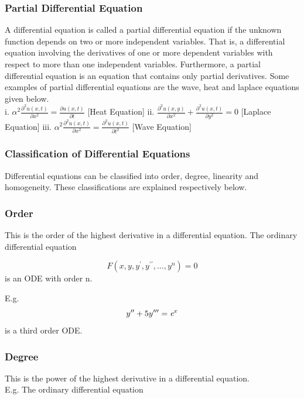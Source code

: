 \documentclass[12pt]{article}
\begin{document}
	\subsubsection*{Partial Differential Equation} 
	A differential equation is called a partial differential equation if the unknown function depends on two or more independent variables. That is, a differential equation involving the derivatives of one or more dependent variables with respect to more than one independent variables. Furthermore, a partial differential equation is an equation that contains only partial derivatives. Some examples of partial differential equations are the wave, heat and laplace equations given below. \\
\smallskip
i. $\alpha^{2}\frac{\partial^{2}u(x,t)}{\partial x^{2}} =  \frac{\partial u(x,t)}{\partial t} $    [Heat Equation]
ii. $\frac{\partial^{2}u(x,y)}{\partial x^{2}} + \frac{\partial^{2}u(x,t)}{\partial y^{2}} = 0 $   [Laplace Equation]  
iii. $\alpha^{2}\frac{\partial^{2}u(x,t)}{\partial x^{2}} = \frac{\partial^{2}u(x,t)}{\partial t^{2}} $   [Wave Equation]

	
	\subsubsection{Classification of Differential Equations} 
	Differential equations can be classified into order, degree, linearity and homogeneity. These classifications are explained respectively below.
	\subsubsection*{Order} 
	This is the order of the highest derivative in a differential equation. The ordinary differential equation
	
		\begin{equation}
	 F(x,y,y^\prime,y^{\prime\prime},\dots,y^n ) = 0
		\end{equation} is an ODE with order n. 
	
	\medskip E.g. \begin{equation}
	y^{\prime\prime} + 5y^{\prime\prime\prime} = \textit e^x
	\end{equation}  is a third order ODE.
	
	\subsubsection*{Degree}
	This is the power of the highest derivative in a differential equation. \\ E.g. The ordinary differential equation
	
\end{document}
